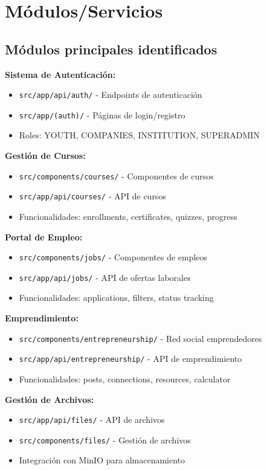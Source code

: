 \documentclass[12pt,a4paper]{article}
\begin{document}
\section{Módulos/Servicios}

\subsection{Módulos principales identificados}

\textbf{Sistema de Autenticación:}
\begin{itemize}
    \item \texttt{src/app/api/auth/} - Endpoints de autenticación
    \item \texttt{src/app/(auth)/} - Páginas de login/registro
    \item Roles: YOUTH, COMPANIES, INSTITUTION, SUPERADMIN
\end{itemize}

\textbf{Gestión de Cursos:}
\begin{itemize}
    \item \texttt{src/components/courses/} - Componentes de cursos
    \item \texttt{src/app/api/courses/} - API de cursos
    \item Funcionalidades: enrollments, certificates, quizzes, progress
\end{itemize}

\textbf{Portal de Empleo:}
\begin{itemize}
    \item \texttt{src/components/jobs/} - Componentes de empleos
    \item \texttt{src/app/api/jobs/} - API de ofertas laborales
    \item Funcionalidades: applications, filters, status tracking
\end{itemize}

\textbf{Emprendimiento:}
\begin{itemize}
    \item \texttt{src/components/entrepreneurship/} - Red social emprendedores
    \item \texttt{src/app/api/entrepreneurship/} - API de emprendimiento
    \item Funcionalidades: posts, connections, resources, calculator
\end{itemize}

\textbf{Gestión de Archivos:}
\begin{itemize}
    \item \texttt{src/app/api/files/} - API de archivos
    \item \texttt{src/components/files/} - Gestión de archivos
    \item Integración con MinIO para almacenamiento
\end{itemize}
\end{document}
